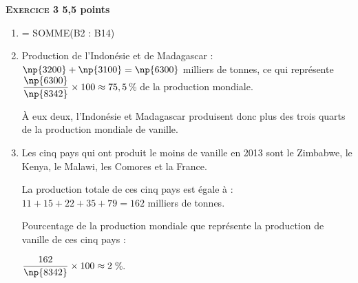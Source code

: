 \textbf{\textsc{Exercice 3} \hfill 5,5 points}

\medskip

\begin{enumerate}
\item  = SOMME(B2 : B14)
\item Production de l'Indonésie et de Madagascar : $\np{3200} + \np{3100} = \np{6300}$ milliers de tonnes, ce qui représente $\dfrac{\np{6300}}{\np{8342}} \times 100 \approx  75,5$\,\% de la production mondiale.

À eux deux, l'Indonésie et Madagascar produisent donc plus des trois quarts de la production mondiale de vanille.
\item Les cinq pays qui ont produit le moins de vanille en 2013 sont le Zimbabwe, le Kenya, le Malawi, les Comores et la France.

La production totale de ces cinq pays est égale à  : $11 + 15 + 22 + 35 + 79 = 162$ milliers de tonnes.

Pourcentage de la production mondiale que représente la production de vanille de ces cinq pays : 

$\dfrac{162}{\np{8342}} \times 100 \approx  2$\,\%.
\end{enumerate}

\vspace{0,5cm}

